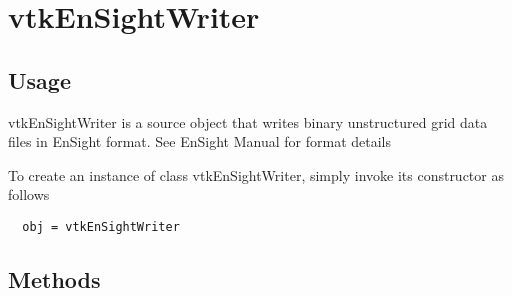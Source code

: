 \section{vtkEnSightWriter}

\subsection{Usage}

 vtkEnSightWriter is a source object that writes binary 
 unstructured grid data files in EnSight format. See EnSight Manual for 
 format details

To create an instance of class vtkEnSightWriter, simply
invoke its constructor as follows
\begin{verbatim}
  obj = vtkEnSightWriter
\end{verbatim}
\subsection{Methods}

